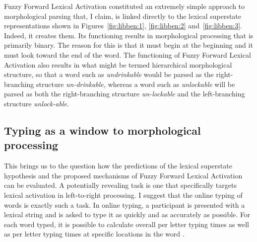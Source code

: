 \documentclass[output=paper]{langsci/langscibook}
\begin{document}

Fuzzy Forward Lexical Activation constituted an extremely simple approach to morphological parsing that, I claim, is linked directly to the lexical superstate representations shown in Figures~\ref{fig:libben:1}, \ref{fig:libben:2} and~\ref{fig:libben:3}. Indeed, it creates them.  Its functioning results in morphological processing that is primarily binary. The reason for this is that it must begin at the beginning and it must look toward the end of the word. The functioning of Fuzzy Forward Lexical Activation also results in what might be termed hierarchical morphological structure, so that a word such as \textit{undrinkable} would be parsed as the right-branching structure \textit{un-drinkable,} whereas a word such as \textit{unlockable} will be parsed as both the right-branching structure \textit{un-lockable} and the left-branching structure \textit{unlock-able}.

\subsection{Typing as a window to morphological processing}\label{sec:libben:1.5}

This brings us to the question how the predictions of the lexical superstate hypothesis and the proposed mechanisms of Fuzzy Forward Lexical Activation can be evaluated.  A potentially revealing task is one that specifically targets lexical activation in left-to-right processing.  I suggest that the online typing of words is exactly such a task.  In online typing, a participant is presented with a lexical string and is asked to type it as quickly and as accurately as possible.  For each word typed, it is possible to calculate overall per letter typing times as well as per letter typing times at specific locations in the word \citep{FeldmanEtAl2019,LibbenJaremaEtAl2016,SahelWeingarten2008,WillWeingarten2006}.
\end{document}
